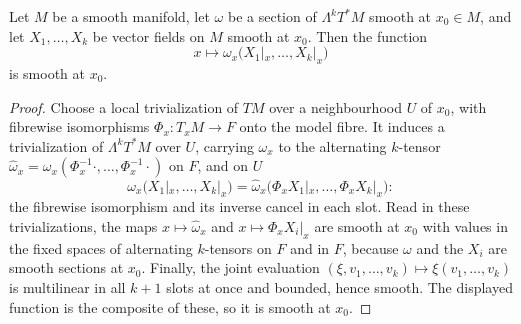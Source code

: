 \begin{lemma}
\label{lem:form-field-applied-to-vector-fields-smooth}
\leanok
Let $M$ be a smooth manifold, let $\omega$ be a section of $\Lambda^k T^*M$ smooth at $x_0 \in M$, and let $X_1, \ldots, X_k$ be vector fields on $M$ smooth at $x_0$. Then the function
\[
x \longmapsto \omega_x\big(X_1|_x, \ldots, X_k|_x\big)
\]
is smooth at $x_0$.
\end{lemma}
\begin{proof}
\leanok
Choose a local trivialization of $TM$ over a neighbourhood $U$ of $x_0$, with fibrewise isomorphisms $\Phi_x : T_xM \to F$ onto the model fibre. It induces a trivialization of $\Lambda^k T^*M$ over $U$, carrying $\omega_x$ to the alternating $k$-tensor $\hat\omega_x = \omega_x(\Phi_x^{-1} \cdot, \ldots, \Phi_x^{-1} \cdot)$ on $F$, and on $U$
\[
\omega_x\big(X_1|_x, \ldots, X_k|_x\big) = \hat\omega_x\big(\Phi_x X_1|_x, \ldots, \Phi_x X_k|_x\big):
\]
the fibrewise isomorphism and its inverse cancel in each slot. Read in these trivializations, the maps $x \mapsto \hat\omega_x$ and $x \mapsto \Phi_x X_i|_x$ are smooth at $x_0$ with values in the fixed spaces of alternating $k$-tensors on $F$ and in $F$, because $\omega$ and the $X_i$ are smooth sections at $x_0$. Finally, the joint evaluation $(\xi, v_1, \ldots, v_k) \mapsto \xi(v_1, \ldots, v_k)$ is multilinear in all $k+1$ slots at once and bounded, hence smooth. The displayed function is the composite of these, so it is smooth at $x_0$.
\end{proof}

